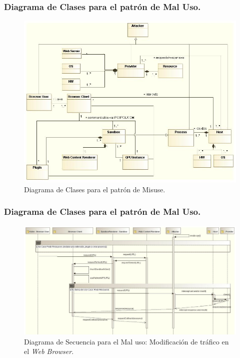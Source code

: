 \documentclass[serif,9pt]{beamer}
\begin{document}
\begin{frame}
	\frametitle{Diagrama de Clases para el patr\'on de Mal Uso.}
	\begin{figure}[h]
	    \centering
	    \includegraphics[scale=0.3]{figures/chap5/patronMisuse_v2.jpg}
	    \caption{Diagrama de Clases para el patr\'on de Misuse.}
	    \label{fig:BIMisuse}
	\end{figure}
\end{frame}

\begin{frame}
	\frametitle{Diagrama de Clases para el patr\'on de Mal Uso.}
	\begin{figure}[h]
        \centering
        \includegraphics[scale=0.32]{figures/chap5/patronMisuseSeq_v2.jpg}
        \caption{Diagrama de Secuencia para el Mal uso: Modificaci\'on de tr\'afico en el \textit{Web Browser}.}
        \label{fig:SeqMisuse}
    \end{figure}
\end{frame}
\end{document}

